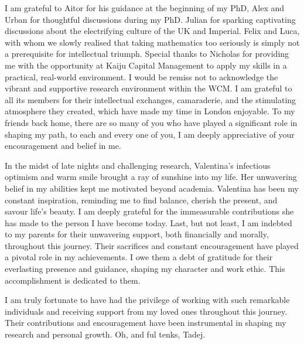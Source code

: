 I am grateful to Aitor for his guidance at the beginning of my PhD, Alex and Urban for thoughtful discussions during my PhD. Julian for sparking captivating discussions about the electrifying culture of the UK and Imperial. Felix and Luca, with whom we slowly realised that taking mathematics too seriously is simply not a prerequisite for intellectual triumph. 
Special thanks to Nicholas for providing me with the opportunity at Kaiju Capital Management to apply my skills in a practical, real-world environment.
\newpage
I would be remiss not to acknowledge the vibrant and supportive research environment within the WCM. I am grateful to all its members for their intellectual exchanges, camaraderie, and the stimulating atmosphere they created, which have made my time in London enjoyable. %
To my friends back home, there are so many of you who have played a significant role in shaping my path, to each and every one of you, I am deeply appreciative of your encouragement and belief in me.

In the midst of late nights and challenging research, Valentina's infectious optimism and warm smile brought a ray of sunshine into my life. Her unwavering belief in my abilities kept me motivated beyond academia. Valentina has been my constant inspiration, reminding me to find balance, cherish the present, and savour life's beauty. I am deeply grateful for the immeasurable contributions she has made to the person I have become today.
Last, but not least, I am indebted to my parents for their unwavering support, both financially and morally, throughout this journey. Their sacrifices and constant encouragement have played a pivotal role in my achievements. I owe them a debt of gratitude for their everlasting presence and guidance, shaping my character and work ethic. This accomplishment is dedicated to them. %

I am truly fortunate to have had the privilege of working with such remarkable individuals and receiving support from my loved ones throughout this journey. Their contributions and encouragement have been instrumental in shaping my research and personal growth. Oh, and ful tenks, Tadej.

